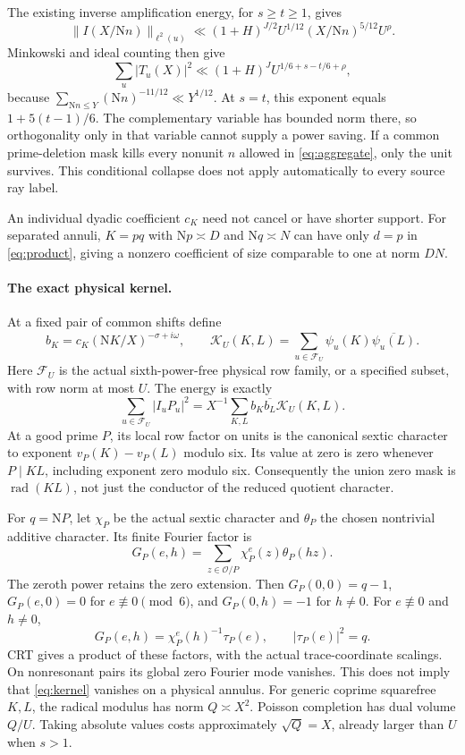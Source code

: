 \documentclass[11pt]{article}
\newcommand{\N}{\mathrm N}
\newcommand{\OO}{\mathcal O}
\newcommand{\rad}{\operatorname{rad}}
\begin{document}
The existing inverse amplification energy, for $s\ge t\ge1$, gives
\[
 \|I(X/\N n)\|_{\ell^2(u)}
 \ll (1+H)^{J/2}U^{1/12}(X/\N n)^{5/12}U^\rho.
\]
Minkowski and ideal counting then give
\begin{equation}\label{eq:aggregate-bound}
 \sum_u|T_u(X)|^2
 \ll (1+H)^J U^{1/6+s-t/6+\rho},
\end{equation}
because $\sum_{\N n\le Y}(\N n)^{-11/12}\ll Y^{1/12}$.
At $s=t$, this exponent equals $1+5(t-1)/6$.
The complementary variable has bounded norm there, so orthogonality only
in that variable cannot supply a power saving.
If a common prime-deletion mask kills every nonunit $n$ allowed in
\eqref{eq:aggregate}, only the unit survives. This conditional collapse
does not apply automatically to every source ray label.

An individual dyadic coefficient $c_K$ need not cancel or have shorter
support. For separated annuli, $K=pq$ with $\N p\asymp D$ and
$\N q\asymp N$ can have only $d=p$ in \eqref{eq:product}, giving
a nonzero coefficient of size comparable to one at norm $DN$.

\paragraph{The exact physical kernel.}
At a fixed pair of common shifts define
\[
 b_K=c_K(\N K/X)^{-\sigma+i\omega},\qquad
 \mathcal K_U(K,L)=\sum_{u\in\mathcal F_U}\psi_u(K)\overline{\psi_u(L)}.
\]
Here $\mathcal F_U$ is the actual sixth-power-free physical row family,
or a specified subset, with row norm at most $U$.
The energy is exactly
\begin{equation}\label{eq:kernel}
 \sum_{u\in\mathcal F_U}|I_uP_u|^2
 =X^{-1}\sum_{K,L}b_K\overline{b_L}\mathcal K_U(K,L).
\end{equation}
At a good prime $P$, its local row factor on units is the canonical sextic
character to exponent $v_P(K)-v_P(L)$ modulo six. Its value at zero is
zero whenever $P\mid KL$, including exponent zero modulo six.
Consequently the union zero mask is $\rad(KL)$, not just the conductor
of the reduced quotient character.

For $q=\N P$, let $\chi_P$ be the actual sextic character and
$\theta_P$ the chosen nontrivial additive character. Its finite Fourier
factor is
\[
 G_P(e,h)=\sum_{z\in\OO/P}\chi_P^e(z)\theta_P(hz).
\]
The zeroth power retains the zero extension.
Then $G_P(0,0)=q-1$, $G_P(e,0)=0$ for $e\not\equiv0\pmod6$,
and $G_P(0,h)=-1$ for $h\ne0$.
For $e\not\equiv0$ and $h\ne0$,
\[
 G_P(e,h)=\chi_P^e(h)^{-1}\tau_P(e),\qquad |\tau_P(e)|^2=q.
\]
CRT gives a product of these factors, with the actual trace-coordinate
scalings. On nonresonant pairs its global zero Fourier mode vanishes.
This does not imply that \eqref{eq:kernel} vanishes on a physical annulus.
For generic coprime squarefree $K,L$, the radical modulus has norm
$Q\asymp X^2$. Poisson completion has dual volume $Q/U$.
Taking absolute values costs approximately $\sqrt Q=X$, already larger
than $U$ when $s>1$.
\end{document}
